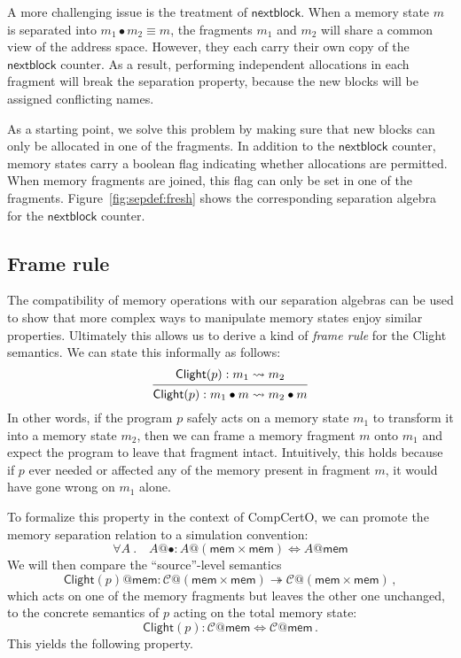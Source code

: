 \documentclass[acmsmall,screen,review,anonymous]{acmart}
\newcommand{\kw}[1]{\ensuremath{ \mathsf{#1} }}
\newcommand{\Clight}{\ensuremath{ \mathsf{Clight} }}
\begin{document}
A more challenging issue is the treatment of $\kw{nextblock}$.
When a memory state $m$ is separated into $m_1 \bullet m_2 \equiv m$,
the fragments $m_1$ and $m_2$ will share a common view of the address space.
However,
they each carry their own copy of the $\kw{nextblock}$ counter.
As a result,
performing independent allocations in each fragment
will break the separation property,
because the new blocks will be assigned conflicting names.

As a starting point,
we solve this problem by
making sure that new blocks
can only be allocated in one of the fragments.
In addition to the $\kw{nextblock}$ counter,
memory states carry a boolean flag
indicating whether allocations are permitted.
When memory fragments are joined,
this flag can only be set in one of the fragments.
Figure~\ref{fig:sepdef:fresh}
shows the corresponding separation algebra
for the $\kw{nextblock}$ counter.


\subsection{Frame rule} %

The compatibility of memory operations with our separation algebras
can be used to show that
more complex ways to manipulate memory states
enjoy similar properties.
Ultimately this allows us to derive
a kind of \emph{frame rule} for the Clight semantics.
We can state this informally as follows:
\[
  \begin{prooftree}
    \hypo{\Clight(p) : m_1 \leadsto m_2}
    \infer1{\Clight(p) : m_1 \bullet m \leadsto m_2 \bullet m}
  \end{prooftree}
\]
In other words,
if the program $p$ safely acts on a memory state $m_1$
to transform it into a memory state $m_2$,
then we can frame a memory fragment $m$ onto $m_1$
and expect the program to leave that fragment intact.
Intuitively, this holds because
if $p$ ever needed or affected any of the memory present
in fragment $m$,
it would have gone wrong on $m_1$ alone.

To formalize this property in the context of CompCertO,
we can promote the memory separation relation
to a simulation convention:
\[
  \forall A \:.\quad
  A@{\bullet} : A@(\kw{mem} \times \kw{mem}) \Leftrightarrow A@\kw{mem}
\]
We will then compare the ``source''-level semantics
\[
  \Clight(p)@\kw{mem} :
    \mathcal{C}@(\kw{mem} \times \kw{mem}) \twoheadrightarrow
    \mathcal{C}@(\kw{mem} \times \kw{mem})
  \,,
\]
which acts on one of the memory fragments
but leaves the other one unchanged,
to the concrete semantics of $p$ acting on the total memory state:
\[
  \Clight(p) : \mathcal{C}@\kw{mem} \Leftrightarrow \mathcal{C}@\kw{mem}
  \,.
\]
This yields the following property.
\end{document}
